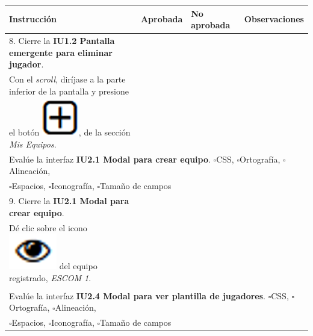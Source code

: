 \documentclass[oneside,10pt]{book}
\begin{document}
\begin{tabularx}{\textwidth}{ l l l X } \\
\hline
\multicolumn{1}{|l|}{Instrucción}                               & \multicolumn{1}{l|}{Aprobada} & \multicolumn{1}{l|}{No aprobada} & \multicolumn{1}{X|}{Observaciones} \\ \hline
\multicolumn{1}{|l|}{8. Cierre la \textbf{IU1.2 Pantalla emergente para eliminar jugador}.} & \multicolumn{1}{l|}{}   & \multicolumn{1}{l|}{}   & \multicolumn{1}{X|}{}              \\
\multicolumn{1}{|l|}{Con el \textit{scroll}, diríjase a la parte inferior de la pantalla y presione} & \multicolumn{1}{l|}{ } & \multicolumn{1}{l|}{ } & \multicolumn{1}{X|}{ } \\ 
\multicolumn{1}{|l|}{el botón \includegraphics[scale=.3]{images/add}, de la sección \textit{Mis Equipos}.} & \multicolumn{1}{l|}{ } & \multicolumn{1}{l|}{ } & \multicolumn{1}{X|}{ } \\ \hline
\multicolumn{4}{|l|}{Evalúe la interfaz \textbf{IU2.1 Modal para crear equipo}. $\square$CSS, $\square$Ortografía, $\square$Alineación,}                        \\
\multicolumn{4}{|l|}{$\square$Espacios, $\square$Iconografía, $\square$Tamaño de campos}                        \\ \hline

\multicolumn{1}{|l|}{9. Cierre la \textbf{IU2.1 Modal para crear equipo}.} & \multicolumn{1}{l|}{}   & \multicolumn{1}{l|}{}   & \multicolumn{1}{X|}{}              \\
\multicolumn{1}{|l|}{Dé clic sobre el icono \includegraphics[scale=.3]{images/visualize} del equipo registrado, \textit{ESCOM 1}.} & \multicolumn{1}{l|}{ } & \multicolumn{1}{l|}{ } & \multicolumn{1}{X|}{ } \\ 
\multicolumn{1}{|l|}{ } & \multicolumn{1}{l|}{ } & \multicolumn{1}{l|}{ } & \multicolumn{1}{X|}{ } \\ \hline
\multicolumn{4}{|l|}{Evalúe la interfaz \textbf{IU2.4 Modal para ver plantilla de jugadores}. $\square$CSS, $\square$Ortografía, $\square$Alineación,}                        \\
\multicolumn{4}{|l|}{$\square$Espacios, $\square$Iconografía, $\square$Tamaño de campos}                        \\ \hline


\end{tabularx}
\end{document}
